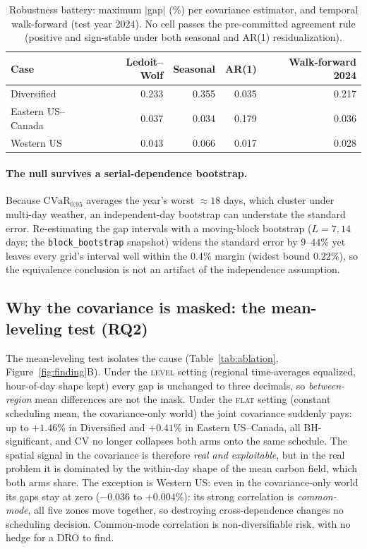 \documentclass[12pt]{article}
\newcommand{\CVaR}{\mathrm{CVaR}}
\begin{document}
\begin{table}[t]
\centering\small
\caption{Robustness battery: maximum $|$gap$|$ (\%) per covariance estimator, and
temporal walk-forward (test year 2024). No cell passes the pre-committed
agreement rule (positive and sign-stable under both seasonal and AR(1)
residualization).}
\label{tab:robust}
\begin{tabular}{lrrrr}
\toprule
Case & Ledoit--Wolf & Seasonal & AR(1) & Walk-forward 2024\\
\midrule
Diversified & 0.233 & 0.355 & 0.035 & 0.217\\
Eastern US--Canada      & 0.037 & 0.034 & 0.179 & 0.036\\
Western US   & 0.043 & 0.066 & 0.017 & 0.028\\
\bottomrule
\end{tabular}
\end{table}

\paragraph{The null survives a serial-dependence bootstrap.} Because $\CVaR_{0.95}$ averages
the year's worst ${\approx}18$ days, which cluster under multi-day weather, an
independent-day bootstrap can understate the standard error. Re-estimating the gap
intervals with a moving-block bootstrap ($L=7,14$ days; the \texttt{block\_bootstrap}
snapshot) widens the standard error by $9$--$44\%$ yet leaves every grid's interval well
within the $0.4\%$ margin (widest bound $0.22\%$), so the equivalence conclusion is not an
artifact of the independence assumption.

\subsection{Why the covariance is masked: the mean-leveling test
(RQ2)}\label{sec:res-ablation}
The mean-leveling test isolates the cause (Table~\ref{tab:ablation},
Figure~\ref{fig:finding}B). Under the \textsc{level} setting (regional
time-averages equalized, hour-of-day shape kept) every gap is unchanged to
three decimals, so \emph{between-region} mean differences are not the mask.
Under the \textsc{flat} setting (constant scheduling mean, the
covariance-only world) the joint covariance suddenly pays: up to $+1.46\%$ in
Diversified and $+0.41\%$ in Eastern US--Canada, all BH-significant, and CV no
longer collapses both arms onto the same schedule. The spatial signal in the
covariance is therefore \emph{real and exploitable}, but in the real problem it is
dominated by the within-day shape of the mean carbon field, which both arms
share. The exception is Western US: even in the covariance-only
world its gaps stay at zero ($-0.036$ to $+0.004\%$): its strong
correlation is \emph{common-mode}, all five zones move together, so destroying
cross-dependence changes no scheduling decision. Common-mode correlation is
non-diversifiable risk, with no hedge for a DRO to find.
\end{document}
